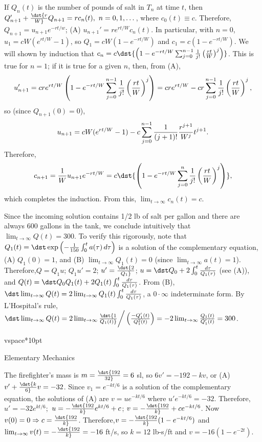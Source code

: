 \documentclass[dvips]{book}
\renewcommand{\exer}[1]{\par\medskip\;\noindent{\color{red}\bf #1.}}
\numberwithin{example}{section}
\numberwithin{equation}{section}
\numberwithin{theorem}{section}
\numberwithin{table}{section}
\numberwithin{figure}{section}
\begin{document}
\exer{4.2.20}
If $Q_n(t)$ is the number of pounds of salt in $T_n$ at time $t$, then
$Q_{n+1}'+\dst{r\over W}Q_{n+1}=rc_n(t),\ n=0,1,\dots$, where
$c_0(t)\equiv c$. Therefore,$Q_{n+1}=u_{n+1}e^{-rt/w}$;
(A) $u_{n+1}'=re^{rt/W}c_n(t)$. In particular, with $n=0$,
$u_1=cW(e^{rt/W}-1)$, so $Q_1=cW(1-e^{-rt/W})$  and
$c_1=c(1-e^{-rt/W})$. We will shown by induction that
$c_n=c\dst{\left(1-e^{-rt/W}\sum_{j=0}^{n-1}{1\over
j!}\left(rt\over W\right)^j\right)}$.
 This is true for $n=1$; if it is
true for a given $n$, then, from (A),
$$
u_{n+1}'=cre^{rt/W}
\left(1-e^{-rt/W}\sum_{j=0}^{n-1}{1\over
j!}\left(rt\over W\right)^j\right)
=cre^{rt/W}-cr
\sum_{j=0}^{n-1}{1\over
j!}\left(rt\over W\right)^j,
$$
so (since $Q_{n+1}(0)=0$),
$$
u_{n+1}=cW(e^{rt/W}-1)-c\sum_{j=0}^{n-1}{1\over(j+1)!}
{r^{j+1}\over W^j}t^{j+1}.
$$
Therefore,
$$
c_{n+1}={1\over W}u_{n+1}e^{-rt/W}=
c\dst{\left(1-e^{-rt/W}\sum_{j=0}^n{1\over
j!}\left(rt\over W\right)^j\right)},
$$
which completes the induction. From this, $\lim_{t\to\infty}c_n(t)=c$.



\exer{4.2.22}
Since the incoming solution contains 1/2 lb of salt per gallon
and there are always 600 gallons in the tank, we conclude
intuitively that $\lim_{t\to\infty}Q(t)=300$.
To verify this rigorously,
note that $Q_1(t)=\dst\exp\left(-{1\over150}\int_0^t
a(\tau)\,d\tau\right)$ is a solution of the complementary equation,
(A) $Q_1(0)=1$, and (B) $\lim_{t\to\infty}Q_1(t)=0$ (since
$\lim_{t\to\infty}a(t)=1$).  Therefore,$Q=Q_1u$; $Q_1u'=2$;
$u'=\dst{2\over Q_1}$;
$u=\dst Q_0+2\int_0^t{d\tau\over Q_1(\tau)}$ (see (A)), and
$Q(t)=\dst Q_0Q_1(t)+2Q_1(t)\int_0^t{d\tau\over Q_1(\tau)}$.
From (B),
$\dst\lim_{t\to\infty}Q(t)=2\lim_{t\to\infty}Q_1(t)
\int_0^t{d\tau\over Q_1(\tau)}$, a $0\cdot\infty$ indeterminate
form. By L'Hospital's rule,
$\dst\lim_{t\to\infty}Q(t)=2\lim_{t\to\infty}
\dst{1\over Q_1(t)}\bigg/\left(-Q_1'(t)\over Q_1^2(t)\right)
=-2\lim_{t\to\infty}{Q_1(t)\over Q_1'(t)}=300$.

vspace*{10pt}

{Elementary Mechanics}
\renewcommand{\thissection}{}
\thissection


\vspace*{-17.5pt}

\exer{4.3.2}
The firefighter's mass is $m=\dst{192\over32}=6$ sl, so
 $6v'=-192-kv$, or (A) $v'+\dst{k\over6}v=-32$.
Since $v_1=e^{-kt/6}$ is a solution of the complementary equation,
the solutions of (A) are $v=ue^{-kt/6}$ where $u'e^{-kt/6}=-32$.
Therefore,$u'=-32e^{kt/6}$;\ $u=-\dst{192\over k}e^{kt/6}+c$;\;
$v=-\dst{192\over k}+ce^{-kt/6}$. Now $v(0)=0\Rightarrow
c=\dst{192\over k}$. Therefore,$v=-\dst{192\over k}(1-e^{-kt/6})$
and $\lim_{t\to\infty}v(t)=-\dst{192\over k}=-16$ ft/s, so $k=12$
lb-s/ft and $v=-16(1-e^{-2t})$.
\end{document}

